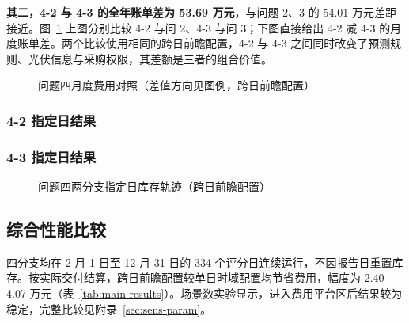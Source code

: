 \textbf{其二，4-2 与 4-3 的全年账单差为 53.69 万元}，与问题 2、3 的 54.01 万元差距接近。图~\ref{fig:fig_f11_q4_monthly} 上图分别比较 4-2 与问 2、4-3 与问 3；下图直接给出 4-2 减 4-3 的月度账单差。两个比较使用相同的跨日前瞻配置，4-2 与 4-3 之间同时改变了预测规则、光伏信息与采购权限，其差额是三者的组合价值。

\begin{figure}[!htbp]\centering
{}
\caption{问题四月度费用对照（差值方向见图例，跨日前瞻配置）}\label{fig:fig_f11_q4_monthly}
\end{figure}
\FloatBarrier
\subsubsection{4-2 指定日结果}

\FloatBarrier
\subsubsection{4-3 指定日结果}

\FloatBarrier

\begin{figure}[!htbp]\centering
{}
\caption{问题四两分支指定日库存轨迹（跨日前瞻配置）}\label{fig:fig_f17_q4_soc}
\end{figure}
\FloatBarrier

\subsection{综合性能比较}
四分支均在 2 月 1 日至 12 月 31 日的 334 个评分日连续运行，不因报告日重置库存。按实际交付结算，跨日前瞻配置较单日时域配置均节省费用，幅度为 2.40--4.07 万元（表~\ref{tab:main-results}）。场景数实验显示，进入费用平台区后结果较为稳定，完整比较见附录~\ref{sec:sens-param}。

\FloatBarrier

